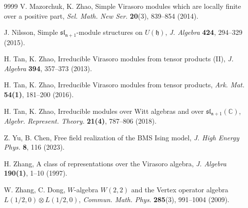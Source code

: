 \documentclass[12pt,leqno,amscd,amsfonts,amssymb]{amsart}
\def\C{\mathbb{C}}
\numberwithin{equation}{section}
\begin{document}
\begin{thebibliography}{9999}
 V. Mazorchuk, K. Zhao, Simple Virasoro modules which are locally finite over a positive part, {\it Sel. Math. New Ser.} {\bf 20}(3), 839--854 (2014).

 J. Nilsson, Simple $\mathfrak{sl_{n+1}}$-module structures on  $U(\mathfrak{h})$, {\it J. Algebra} {\bf 424}, 294--329 (2015).

  H. Tan, K. Zhao, Irreducible Virasoro modules from tensor products (II), {\it J. Algebra} {\bf 394}, 357--373 (2013).

  H. Tan, K. Zhao, Irreducible Virasoro modules from tensor products, {\it Ark. Mat.} {\bf 54(1)}, 181--200 (2016).

 H. Tan,  K.  Zhao,  Irreducible modules over Witt algebras and over $\mathfrak{sl_{n+1}}(\C)$, {\it Algebr. Represent. Theory.} {\bf 21(4)}, 787--806 (2018).



%

 Z. Yu, B. Chen, Free field realization of the BMS Ising model, {\it J. High Energy Phys.}  {\bf 8},  116 (2023).

 H. Zhang, A class of representations over the Virasoro algebra, {\it J. Algebra}  {\bf 190(1)}, 1--10 (1997).

 W. Zhang,  C. Dong, $W$-algebra $W(2,2)$ and the Vertex operator algebra $L(1/2,0)\otimes L(1/2,0)$, {\it Commun. Math. Phys}. {\bf 285}(3), 991--1004 (2009).
    \end{thebibliography}
\end{document}
